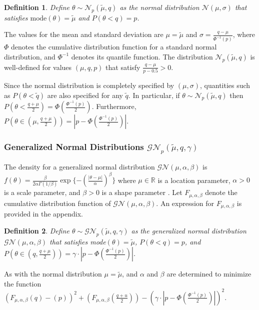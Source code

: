\documentclass[12pt]{article}
\newtheorem{mydef}{Definition}
\begin{document}
\begin{mydef}\label{def:normal}
Define $\theta\sim\mathcal{N}_p(\tilde{\mu},q)$ as the normal distribution $\mathcal{N}(\mu,\sigma)$ that satisfies $\text{mode}(\theta)=\tilde{\mu}$ and $P(\theta<q)=p$.
\end{mydef}

 The values for the mean and standard deviation are $\mu=\tilde{\mu}$ and $\sigma=\frac{q-\mu}{\Phi^{-1}(p)}$, where $\Phi$ denotes the cumulative distribution function for a standard normal distribution, and $\Phi^{-1}$ denotes its quantile function. The distribution $\mathcal{N}_p(\tilde{\mu},q)$ is well-defined for values $(\mu,q,p)$ that satisfy $\frac{q-\mu}{p-0.5}>0$.


 Since the normal distribution is completely specified by $(\mu, \sigma)$, quantities such as $P(\theta<\tilde{q})$ are also specified for any $\tilde{q}$. In particular, if $\theta\sim\mathcal{N}_p(\tilde{\mu},q)$ then $P(\theta<\frac{q+\mu}{2})=\Phi(\frac{\Phi^{-1}(p)}{2})$. Furthermore, $P(\theta\in(\mu,\frac{q+\mu}{2}))=|p-\Phi(\frac{\Phi^{-1}(p)}{2})|$. 

\subsubsection{Generalized Normal Distributions $\mathcal{GN}_p(\tilde{\mu},q,\gamma)$}
The density for a generalized normal distribution $\mathcal{GN}(\mu,\alpha,\beta)$ is
$
f(\theta)=\frac{\beta}{2\alpha\Gamma(1/\beta)}\exp\{-(\frac{|\theta-\mu|}{\alpha})^\beta\}
$ where $\mu\in\mathbb{R}$ is a location parameter, $\alpha>0$ is a scale parameter, and $\beta>0$ is a shape parameter \citep{Nadarajah2005}. Let $F_{\mu,\alpha,\beta}$ denote the cumulative distribution function of $\mathcal{GN}(\mu,\alpha,\beta)$. An expression for $F_{\mu,\alpha,\beta}$ is provided in the appendix.

\begin{mydef}\label{def:gennormal}
Define $\theta\sim\mathcal{GN}_p(\tilde{\mu},q,\gamma)$ as the generalized normal distribution $\mathcal{GN}(\mu,\alpha,\beta)$ that satisfies mode$(\theta)=\tilde{\mu}$, $P(\theta<q)=p$, and $P(\theta\in(q,\frac{q+\mu}{2}))=\gamma\cdot|p-\Phi(\frac{\Phi^{-1}(p)}{2})|$.
\end{mydef}

 As with the normal distribution $\mu=\tilde{\mu}$, and $\alpha$ and $\beta$ are determined to minimize the function $(F_{\mu,\alpha,\beta}(q)-(p))^2+(F_{\mu,\alpha,\beta}(\frac{q+u}{2}))-(\gamma\cdot|p-\Phi(\frac{\Phi^{-1}(p)}{2})|)^2$.
\end{document}
